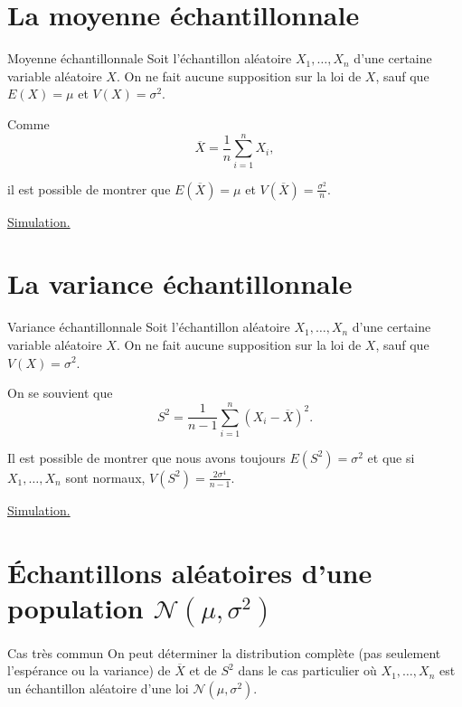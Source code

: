 \documentclass{BeamerTemplate}
\begin{document}
\section{La moyenne échantillonnale}
\begin{frame}[t]{Moyenne échantillonnale}
Soit l'échantillon aléatoire  $X_1,\hdots,X_n$ d'une certaine variable aléatoire $X$. 
On ne fait aucune supposition sur la loi de $X$, sauf que $E(X)=\mu$ et $V(X)=\sigma^2$.

Comme $$\overline{X}=\frac{1}{n}\sum_{i=1}^nX_i,$$

il est possible de montrer que $E(\overline{X})=\mu$ et $\displaystyle V(\overline{X})=\frac{\sigma^2}{n}$.

\vspace{0.5cm}
\vfill
    \href{https://jmiron-moyechexp.share.connect.posit.cloud/}{Simulation.}
\end{frame}

\section{La variance échantillonnale}

\begin{frame}[t]{Variance échantillonnale}
Soit l'échantillon aléatoire  $X_1,\hdots,X_n$ d'une certaine variable aléatoire $X$. 
On ne fait aucune supposition sur la loi de $X$, sauf que $V(X)=\sigma^2$.

On se souvient que $$S^2=\frac{1}{n-1}\sum_{i=1}^n(X_i-\overline{X})^2.$$

Il est possible de montrer que nous avons toujours $E(S^2)=\sigma^2$ et que si $X_1,\hdots,X_n$ sont normaux, $\displaystyle V(S^2)=\frac{2\sigma^4}{n-1}$.

\vspace{1cm}
\href{https://jmiron-moyechexp.share.connect.posit.cloud/}{Simulation.}

\end{frame}

\section{Échantillons aléatoires d'une population $\mathcal{N}(\mu,\sigma^2)$}

\begin{frame}[t]{Cas très commun}
    On peut déterminer la distribution complète (pas seulement l'espérance ou la variance) 
    de $\overline{X}$ et de $S^2$ dans le cas particulier où $X_1,\dots,X_n$ est un échantillon
    aléatoire d'une loi $\mathcal{N}(\mu,\sigma^2)$.
\end{frame}
\end{document}
